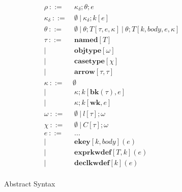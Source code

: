 \begin{figure}[t]
\begin{align*}
      \rho              ~::=&~ \kappa_{\delta};\theta;e\\
      \kappa_{\delta}   ~::=&~ \emptyset ~ | ~ \kappa_{\delta};k[e]\\
      \theta                  ~::=&~ \emptyset ~ | ~ \theta; T[\tau, e, \kappa] ~ | ~ \theta; T[k, body, e, \kappa]\\
      \tau              ~::=&~ \mathbf{named}[T]\\
                              |~    & ~ \mathbf{objtype}[\omega]\\
                              |~    & ~ \mathbf{casetype}[\chi]\\
                              |~  & ~ \mathbf{arrow}[\tau, \tau]\\
      \kappa                  ~::=& \emptyset\\       
                              |~  & ~ \kappa;k[\mathbf{bk}(\tau),e]\\
                              |~  & ~ \kappa;k[\mathbf{wk},e]\\
      \omega                  ~::=&~ \emptyset ~|~ l[\tau];\omega\\
      \chi              ~::=& ~\emptyset ~ | ~C[\tau];\omega\\
      e                       ~::=&~ ...\\
                              | ~ &~ \mathbf{ekey}[k,body](e)\\
                              | ~ &~ \mathbf{exprkwdef}[T,k](e)\\
                              | ~ &~ \mathbf{declkwdef}[k](e)\\
\end{align*}
\caption{Abstract Syntax}
\label{formal-syntax}
\end{figure}